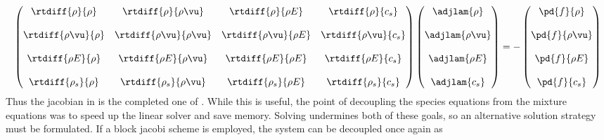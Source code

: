 \begin{equation}
  \begin{pmatrix}
    \rtdiff{\rho}{\rho} & \rtdiff{\rho}{\rho \vu} & 
    \rtdiff{\rho}{\rho E} & \rtdiff{\rho}{c_s} \\ \\
    \rtdiff{\rho \vu}{\rho} & \rtdiff{\rho \vu}{\rho \vu} & 
    \rtdiff{\rho \vu}{\rho E} & \rtdiff{\rho \vu}{c_s} \\ \\
    \rtdiff{\rho E}{\rho} & \rtdiff{\rho E}{\rho \vu} & 
    \rtdiff{\rho E}{\rho E} & \rtdiff{\rho E}{c_s} \\ \\
    \rtdiff{\rho_s}{\rho} & \rtdiff{\rho_s}{\rho \vu} & 
    \rtdiff{\rho_s}{\rho E} & \rtdiff{\rho_s}{c_s}
  \end{pmatrix}
  \begin{pmatrix}
    \adjlam{\rho} \\ \\
    \adjlam{\rho \vu} \\ \\
    \adjlam{\rho E} \\ \\
    \adjlam{c_s}
  \end{pmatrix}
  = -
  \begin{pmatrix}
    \pd{f}{\rho} \\ \\
    \pd{f}{\rho \vu} \\ \\
    \pd{f}{\rho E} \\ \\
    \pd{f}{c_s}
  \end{pmatrix}
  \label{full-adjoint}
\end{equation}
Thus the jacobian in  is the completed one of
.  While this is useful, the point of
decoupling the species equations from the mixture equations was to speed up the
linear solver and save memory.  Solving  undermines both of
these goals, so an alternative solution strategy must be formulated.  If a block
jacobi scheme is employed, the system can be decoupled once again as

